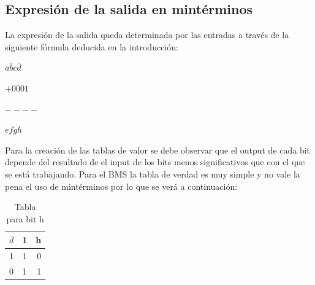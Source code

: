 \subsection{Expresión de la salida en mintérminos}
\hspace{10mm} La expresión de la salida queda determinada por las entradas a través de la siguiente fórmula deducida en la introducción:\\
\centerline{$\overline{a} \overline{b} \overline{c} \overline{d}$}
\centerline{$+0001$}
\centerline{$----$}
\centerline{$efgh$}	
\hspace{10mm} Para la creación de las tablas de valor se debe observar que el output de cada bit depende del resultado de el input de los bits menos significativos que con el que se está trabajando.
Para el BMS la tabla de verdad es muy simple y no vale la pena el uso de mintérminos por lo que se verá a continuación:
\begin{table}[H]
	\begin{center}
		\caption{Tabla para bit h}
		\vspace{5mm}
		\begin{tabular}{l|c|r}
			\textbf{$\overline{d}$} & \textbf{1} & \textbf{h} \\
			\hline
			1                       & 1          & 0          \\
			0                       & 1          & 1          \\			
		\end{tabular}
	\end{center}
\end{table}

